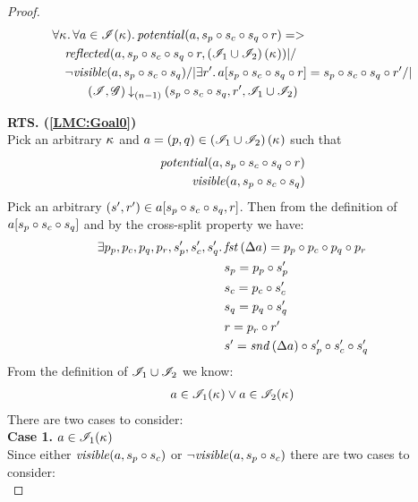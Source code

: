 \begin{lemma}
\begin{proof}
\begin{align}
%  
  &\V{\ca{}}\V{a\in \lmod(\ca{})}
  \m{potential}(a,s_p \composeL s_c \composeL s_q \composeL r) =>\null \nonumber \\
  &\quad \m{reflected}(a,s_p \composeL s_c \composeL s_q \composeL r,\left(\lmod_{1} \cup \lmod_{2}\right)(\ca{})) |/\null \nonumber \\
%  
  &\quad \neg\m{visible}(a,s_p \composeL s_c \composeL s_q) /| \exsts{r'}a[s_p \composeL s_c \composeL s_q \composeL r] = s_p \composeL s_c \composeL s_q \composeL r' /| \nonumber\\
  &\hspace{1cm}\extendsAMUptob{\lmod, \gmod}{(n-1)}{s_p \composeL s_c \composeL s_q, r'}{\lmod_{1} \cup \lmod_{2}} \label{LMC:Goal3}
\end{align}
%
%

\noindent\textbf{RTS. (\ref{LMC:Goal0})}\\
Pick an arbitrary $\kappa_{}$ and $a = (p, q) \in \left(\mathscr{I}_{1} \cup \mathscr{I}_{2} \right)(\kappa_{})$ such that
\begin{align}
	\mathit{potential}(a, s_p \circ s_c \circ s_q \circ r) \label{LMC:Ass3}\\
	\mathit{visible}(a, s_p \circ s_c \circ s_q) \label{LMC:visible-pcq}
\end{align}
%
Pick an arbitrary $(s', r') \in a[s_p \circ s_c \circ s_q, r]$. Then from the definition of $a[s_p \circ s_c \circ s_q]$ and by the cross-split property we have:
%
\begin{align}
	\exists p_p, p_c, p_q, p_r, s_p', s_c', s_q'.\, & \mathit{fst}\left(\Delta {a}\right) = p_p \circ p_c \circ p_q \circ p_r \label{LMC:Ass4}\\
	& s_p = p_p \circ s_p' \label{LMC:Ass5}\\
	& s_c = p_c \circ s_c' \label{LMC:Ass6}\\
	& s_q = p_q \circ s_q' \label{LMC:Ass7}\\
	& r = p_r \circ r' \label{LMC:Ass8}\\
	& s' = \mathit{snd}\left(\Delta {a}\right) \circ s_p' \circ s_c' \circ s_q' \label{LMC:Ass9}
\end{align}
%
From the definition of $\mathscr{I}_{1} \cup \mathscr{I}_{2}$ we know:
%
\begin{align}
	a \in \mathscr{I}_{1}(\kappa_{}) \lor a \in \mathscr{I}_{2}(\kappa_{}) \nonumber
\end{align}
There are two cases to consider:\\

\noindent\textbf{Case 1.} $a \in \mathscr{I}_{1}(\kappa_{})$\\
%
Since either $\mathit{visible}(a, s_p \circ s_c)$ or $\neg\mathit{visible}(a, s_p \circ s_c)$ there are two cases to consider:\\


\end{proof}
\end{lemma}
